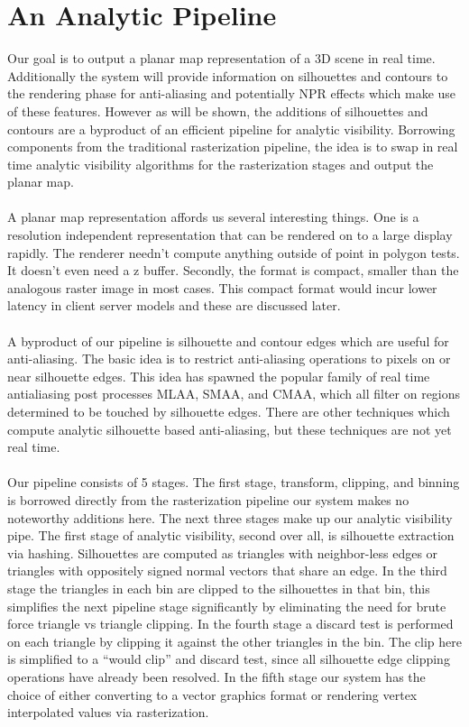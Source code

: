 \documentclass[review]{acmsiggraph}
\begin{document}
\section{An Analytic Pipeline}
Our goal is to output a planar map representation of a 3D scene in real time. Additionally the system will provide information on silhouettes and contours to the rendering phase for anti-aliasing and potentially NPR effects which make use of these features. However as will be shown, the additions of silhouettes and contours are a byproduct of an efficient pipeline for analytic visibility. Borrowing components from the traditional rasterization pipeline, the idea is to swap in real time analytic visibility algorithms for the rasterization stages and output the planar map. 
\\\\
A planar map representation affords us several interesting things. One is a resolution independent representation that can be rendered on to a large display rapidly. The renderer needn’t compute anything outside of point in polygon tests. It doesn’t even need a z buffer. Secondly, the format is compact, smaller than the analogous raster image in most cases. This compact format would incur lower latency in client server models and these are discussed later. 
\\\\
A byproduct of our pipeline is silhouette and contour edges which are useful for anti-aliasing. The basic idea is to restrict anti-aliasing operations to pixels on or near silhouette edges. This idea has spawned the popular family of real time antialiasing post processes MLAA, SMAA, and CMAA, which all filter on regions determined to be touched by silhouette edges. There are other techniques which compute analytic silhouette based anti-aliasing, but these techniques are not yet real time.
\\\\
Our pipeline consists of 5 stages. The first stage, transform, clipping, and binning is borrowed directly from the rasterization pipeline our system makes no noteworthy additions here. The next three stages make up our analytic visibility pipe. The first stage of analytic visibility, second over all, is silhouette extraction via hashing. Silhouettes are computed as triangles with neighbor-less edges or triangles with oppositely signed normal vectors that share an edge. In the third stage the triangles in each bin are clipped to the silhouettes in that bin, this simplifies the next pipeline stage significantly by eliminating the need for brute force triangle vs triangle clipping. In the fourth stage a discard test is performed on each triangle by clipping it against the other triangles in the bin. The clip here is simplified to a “would clip” and discard test, since all silhouette edge clipping operations have already been resolved. In the fifth stage our system has the choice of either converting to a vector graphics format or rendering vertex interpolated values via rasterization.
\end{document}
